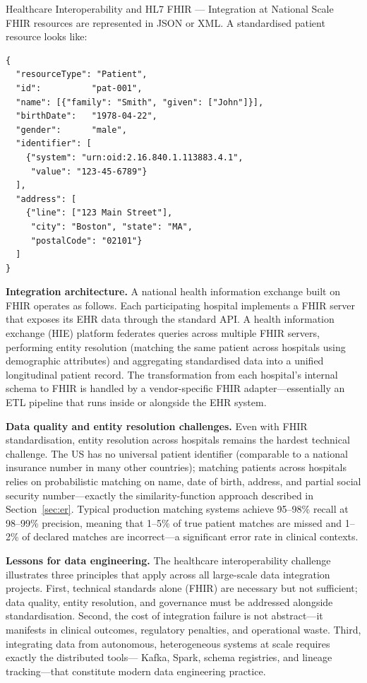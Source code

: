 \begin{casestudy}{Healthcare Interoperability and HL7 FHIR --- Integration at National Scale}
FHIR resources are represented in JSON or XML. A standardised patient
resource looks like:

\begin{lstlisting}[style=pseudocode, caption={A partial HL7 FHIR Patient resource (JSON)}]
{
  "resourceType": "Patient",
  "id":          "pat-001",
  "name": [{"family": "Smith", "given": ["John"]}],
  "birthDate":   "1978-04-22",
  "gender":      "male",
  "identifier": [
    {"system": "urn:oid:2.16.840.1.113883.4.1",
     "value": "123-45-6789"}
  ],
  "address": [
    {"line": ["123 Main Street"],
     "city": "Boston", "state": "MA",
     "postalCode": "02101"}
  ]
}
\end{lstlisting}

\textbf{Integration architecture.}
A national health information exchange built on FHIR operates as
follows. Each participating hospital implements a FHIR server that
exposes its EHR data through the standard API. A health information
exchange (HIE) platform federates queries across multiple FHIR servers,
performing entity resolution (matching the same patient across hospitals
using demographic attributes) and aggregating standardised data into a
unified longitudinal patient record. The transformation from each
hospital's internal schema to FHIR is handled by a vendor-specific
FHIR adapter---essentially an ETL pipeline that runs inside or alongside
the EHR system.

\smallskip
\textbf{Data quality and entity resolution challenges.}
Even with FHIR standardisation, entity resolution across hospitals
remains the hardest technical challenge. The US has no universal patient
identifier (comparable to a national insurance number in many other
countries); matching patients across hospitals relies on probabilistic
matching on name, date of birth, address, and partial social security
number---exactly the similarity-function approach described in
Section~\ref{sec:er}. Typical production matching systems achieve 95--98\%
recall at 98--99\% precision, meaning that 1--5\% of true patient matches
are missed and 1--2\% of declared matches are incorrect---a significant
error rate in clinical contexts.

\smallskip
\textbf{Lessons for data engineering.}
The healthcare interoperability challenge illustrates three principles
that apply across all large-scale data integration projects. First,
technical standards alone (FHIR) are necessary but not sufficient;
data quality, entity resolution, and governance must be addressed
alongside standardisation. Second, the cost of integration failure is
not abstract---it manifests in clinical outcomes, regulatory penalties,
and operational waste. Third, integrating data from autonomous,
heterogeneous systems at scale requires exactly the distributed tools---
Kafka, Spark, schema registries, and lineage tracking---that constitute
modern data engineering practice.
\end{casestudy}

